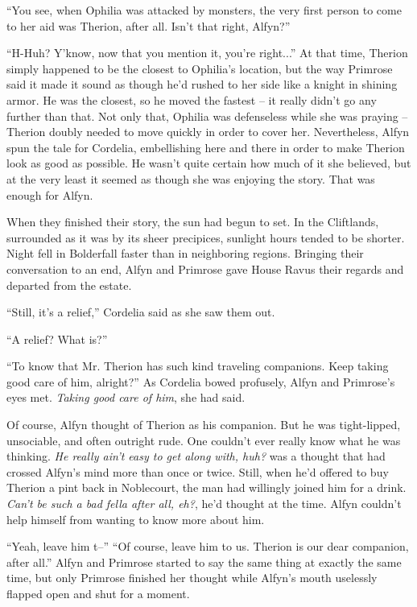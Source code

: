 ``You see, when Ophilia was attacked by monsters, the very first person to come to her aid was Therion, after all. Isn't that right, Alfyn?''

``H-Huh? Y'know, now that you mention it, you're right...'' At that time, Therion simply happened to be the closest to Ophilia's location, but the way Primrose said it made it sound as though he'd rushed to her side like a knight in shining armor. He was the closest, so he moved the fastest -- it really didn't go any further than that. Not only that, Ophilia was defenseless while she was praying -- Therion doubly needed to move quickly in order to cover her. Nevertheless, Alfyn spun the tale for Cordelia, embellishing here and there in order to make Therion look as good as possible. He wasn't quite certain how much of it she believed, but at the very least it seemed as though she was enjoying the story. That was enough for Alfyn.

When they finished their story, the sun had begun to set. In the Cliftlands, surrounded as it was by its sheer precipices, sunlight hours tended to be shorter. Night fell in Bolderfall faster than in neighboring regions. Bringing their conversation to an end, Alfyn and Primrose gave House Ravus their regards and departed from the estate.

``Still, it's a relief,'' Cordelia said as she saw them out. 

``A relief? What is?''

``To know that Mr. Therion has such kind traveling companions. Keep taking good care of him, alright?'' As Cordelia bowed profusely, Alfyn and Primrose's eyes met. \emph{Taking good care of him}, she had said.

Of course, Alfyn thought of Therion as his companion. But he was tight-lipped, unsociable, and often outright rude. One couldn't ever really know what he was thinking. \emph{He really ain't easy to get along with, huh?} was a thought that had crossed Alfyn's mind more than once or twice. Still, when he'd offered to buy Therion a pint back in Noblecourt, the man had willingly joined him for a drink. \emph{Can't be such a bad fella after all, eh?}, he'd thought at the time. Alfyn couldn't help himself from wanting to know more about him.

``Yeah, leave him t--'' ``Of course, leave him to us. Therion is our dear companion, after all.'' Alfyn and Primrose started to say the same thing at exactly the same time, but only Primrose finished her thought while Alfyn's mouth uselessly flapped open and shut for a moment. 

